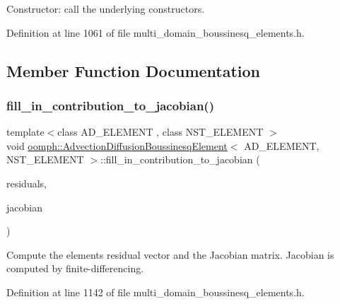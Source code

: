 Constructor\+: call the underlying constructors. 



Definition at line 1061 of file multi\+\_\+domain\+\_\+boussinesq\+\_\+elements.\+h.



\subsection{Member Function Documentation}
\mbox{\label{classoomph_1_1AdvectionDiffusionBoussinesqElement_afc63db5ad4e397df7809447ee3ca56ac}} 
\subsubsection{\texorpdfstring{fill\+\_\+in\+\_\+contribution\+\_\+to\+\_\+jacobian()}{fill\_in\_contribution\_to\_jacobian()}}
{\footnotesize\ttfamily template$<$class A\+D\+\_\+\+E\+L\+E\+M\+E\+NT , class N\+S\+T\+\_\+\+E\+L\+E\+M\+E\+NT $>$ \\
void \hyperlink{classoomph_1_1AdvectionDiffusionBoussinesqElement}{oomph\+::\+Advection\+Diffusion\+Boussinesq\+Element}$<$ A\+D\+\_\+\+E\+L\+E\+M\+E\+NT, N\+S\+T\+\_\+\+E\+L\+E\+M\+E\+NT $>$\+::fill\+\_\+in\+\_\+contribution\+\_\+to\+\_\+jacobian (\begin{DoxyParamCaption}\item[{Vector$<$ double $>$ \&}]{residuals,  }\item[{Dense\+Matrix$<$ double $>$ \&}]{jacobian }\end{DoxyParamCaption})\hspace{0.3cm}{\ttfamily [inline]}}



Compute the element\textquotesingle{}s residual vector and the Jacobian matrix. Jacobian is computed by finite-\/differencing. 



Definition at line 1142 of file multi\+\_\+domain\+\_\+boussinesq\+\_\+elements.\+h.

